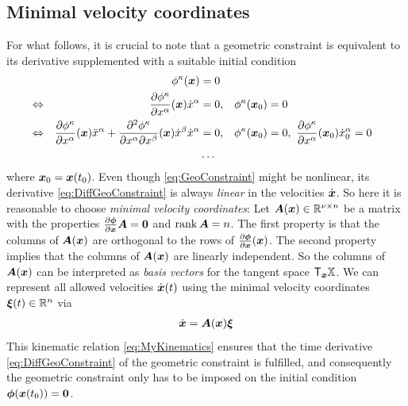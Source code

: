 \subsection{Minimal velocity coordinates}\label{sec:secMathMinVelCoord}
For what follows, it is crucial to note that a geometric constraint is equivalent to its derivative supplemented with a suitable initial condition
\begin{subequations}\label{eq:DiffConstraint}
\begin{align}
 \label{eq:GeoConstraint}
 &&
 \geoConstraintCoeff{\CidxI}(\sysCoord) &= 0
\\
 \label{eq:DiffGeoConstraint}
 &\Leftrightarrow&
 \pdiff[\geoConstraintCoeff{\CidxI}]{\sysCoordCoeff{\GidxI}}(\sysCoord) \sysCoordCoeffd{\GidxI} &= 0,&
 \geoConstraintCoeff{\CidxI}(\sysCoord_0) &= 0
\\
 &\Leftrightarrow&
 \pdiff[\geoConstraintCoeff{\CidxI}]{\sysCoordCoeff{\GidxI}}(\sysCoord) \sysCoordCoeffdd{\GidxI} + \frac{\partial^2 \geoConstraintCoeff{\CidxI}}{\partial \sysCoordCoeff{\GidxI} \partial \sysCoordCoeff{\GidxII}}(\sysCoord) \sysCoordCoeffd{\GidxII} \sysCoordCoeffd{\GidxI} &= 0,&
 \geoConstraintCoeff{\CidxI}(\sysCoord_0) &= 0, \ \pdiff[\geoConstraintCoeff{\CidxI}]{\sysCoordCoeff{\GidxI}}(\sysCoord_0) \sysCoordCoeffd{\GidxI}_0 = 0
\\
 &&
 &\ldots \nonumber
\end{align}
\end{subequations}
where $\sysCoord_0 = \sysCoord(t_0)$.
Even though \eqref{eq:GeoConstraint} might be nonlinear, its derivative \eqref{eq:DiffGeoConstraint} is always \textit{linear} in the velocities $\sysCoordd$.
So here it is reasonable to choose \textit{minimal velocity coordinates}:
Let $\kinMat(\sysCoord) \in \RealNum^{\numCoord\times\dimConfigSpace}$ be a matrix with the properties $\pdiff[\geoConstraint]{\sysCoord} \kinMat = \mat{0}$ and $\rank \kinMat = \dimConfigSpace$.
The first property is that the columns of $\kinMat(\sysCoord)$ are orthogonal to the rows of $\pdiff[\geoConstraint]{\sysCoord}(\sysCoord)$.
The second property implies that the columns of $\kinMat(\sysCoord)$ are linearly independent.
So the columns of $\kinMat(\sysCoord)$ can be interpreted as \textit{basis vectors} for the tangent space $\Tangent[\sysCoord] \configSpace$.
We can represent all allowed velocities $\sysCoordd(t)$ using the minimal velocity coordinates $\sysVel(t) \in \RealNum^{\dimConfigSpace}$ via
\begin{align}\label{eq:MyKinematics}
 \sysCoordd = \kinMat(\sysCoord) \sysVel
\end{align}
This kinematic relation \eqref{eq:MyKinematics} ensures that the time derivative \eqref{eq:DiffGeoConstraint} of the geometric constraint is fulfilled, and consequently the geometric constraint only has to be imposed on the initial condition $\geoConstraint(\sysCoord(t_0)) = \tuple{0}$.

